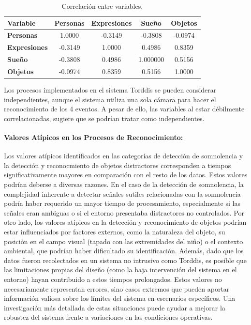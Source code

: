 \documentclass[a4paper,fleqn]{cas-sc}
\begin{document}
						\begin{table}[hbt!]
							\centering
							\caption{Correlación entre variables.}
							\label{tab:correlation-recognition}
							\begin{tabularx}{0.6\textwidth}{Xcccc}
								\toprule
								\textbf{Variable} & \textbf{Personas} & \textbf{Expresiones} & \textbf{Sueño} & \textbf{Objetos} \\
								\midrule
								\textbf{Personas} & 1.0000  & -0.3149 & -0.3808 & -0.0974 \\
								\textbf{Expresiones} & -0.3149 & 1.0000  &  0.4986 &  0.8359 \\
								\textbf{Sueño} & -0.3808 &  0.4986 &  1.000000 &  0.5156 \\
								\textbf{Objetos} & -0.0974 &  0.8359 &  0.5156 &  1.0000 \\
								\bottomrule
							\end{tabularx}
						\end{table}
						
						Los procesos implementados en el sistema Torddis se pueden considerar independientes, aunque el sistema utiliza una sola cámara para hacer el reconocimiento de los 4 eventos. A pesar de ello, las variables al estar débilmente correlacionadas, sugiere que se podrían tratar como independientes.
					
					\paragraph{Valores Atípicos en los Procesos de Reconocimiento:}
						Los valores atípicos identificados en las categorías de detección de somnolencia y la detección y reconocmiento de objetos distractores corresponden a tiempos significativamente mayores en comparación con el resto de los datos. Estos valores podrían deberse a diversas razones. En el caso de la detección de somnolencia, la complejidad inherente a detectar señales sutiles relacionadas con la somnolencia podría haber requerido un mayor tiempo de procesamiento, especialmente si las señales eran ambiguas o si el entorno presentaba distractores no controlados. Por otro lado, los valores atípicos en la detección y reconocimiento de objetos podrían estar influenciados por factores externos, como la naturaleza del objeto, su posición en el campo visual (tapado con las extremidades del niño) o el contexto ambiental, que podrían haber dificultado su identificación. Además, dado que los datos fueron recolectados en un sistema no intrusivo como Torddis, es posible que las limitaciones propias del diseño (como la baja intervención del sistema en el entorno) hayan contribuido a estos tiempos prolongados. Estos valores no necesariamente representan errores, sino casos extremos que pueden aportar información valiosa sobre los límites del sistema en escenarios específicos. Una investigación más detallada de estas situaciones puede ayudar a mejorar la robustez del sistema frente a variaciones en las condiciones operativas.
									
\end{document}
